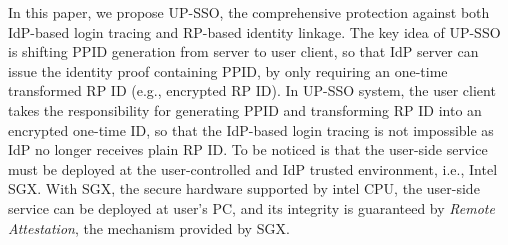 In this paper, we propose UP-SSO, 
the comprehensive protection against both IdP-based login tracing and RP-based identity linkage.
The key idea of UP-SSO is shifting PPID generation from server to user client,
so that IdP server can issue the identity proof containing PPID, by only requiring an one-time transformed RP ID (e.g., encrypted RP ID). 
In UP-SSO system, the user client takes the responsibility for generating PPID and transforming RP ID into an encrypted one-time ID,
so that the IdP-based login tracing is not impossible as IdP no longer receives plain RP ID.
To be noticed is that the user-side service must be deployed at the user-controlled and IdP trusted environment, i.e., Intel SGX. 
With SGX, the secure hardware supported by intel CPU, the user-side service can be deployed at user's PC, and its integrity is guaranteed by \emph{Remote Attestation}, the mechanism provided by SGX.



